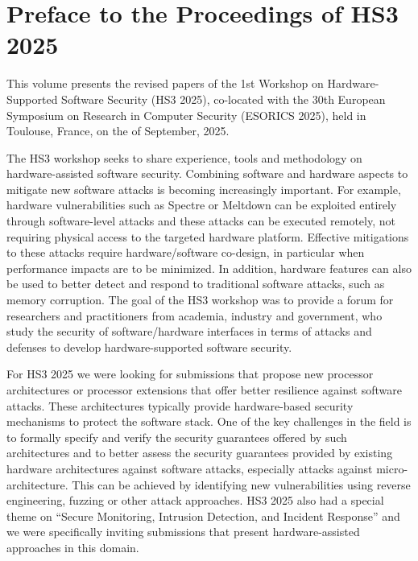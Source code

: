 \documentclass[runningheads]{llncs}
\begin{document}
\frontmatter
\setcounter{page}{5}

\chapter*{Preface to the Proceedings of HS3 2025}

This volume presents the revised papers of the 1st Workshop on
Hardware-Supported Software Security (HS3 2025), co-located with the 30th
European Symposium on Research in Computer Security (ESORICS 2025), held in
Toulouse, France, on the  of September, 2025.

The HS3 workshop seeks to share experience, tools and methodology on
hardware-assisted software security. Combining software and hardware
aspects to mitigate new software attacks is becoming increasingly
important. For example, hardware vulnerabilities such as Spectre or
Meltdown can be exploited entirely through software-level attacks and these
attacks can be executed remotely, not requiring physical access to the
targeted hardware platform. Effective mitigations to these attacks require
hardware/software co-design, in particular when performance impacts are to
be minimized. In addition, hardware features can also be used to better
detect and respond to traditional software attacks, such as memory
corruption. The goal of the HS3 workshop was to provide a forum for
researchers and practitioners from academia, industry and government, who
study the security of software/hardware interfaces in terms of attacks and
defenses to develop hardware-supported software security.

For HS3 2025 we were looking for submissions that propose new processor
architectures or processor extensions that offer better resilience against
software attacks. These architectures typically provide hardware-based
security mechanisms to protect the software stack. One of the key
challenges in the field is to formally specify and verify the security
guarantees offered by such architectures and to better assess the security
guarantees provided by existing hardware architectures against software
attacks, especially attacks against micro-architecture. This can be
achieved by identifying new vulnerabilities using reverse engineering,
fuzzing or other attack approaches. HS3 2025 also had a special theme on
\enquote{Secure Monitoring, Intrusion Detection, and Incident Response} and
we were specifically inviting submissions that present hardware-assisted
approaches in this domain.
\end{document}

